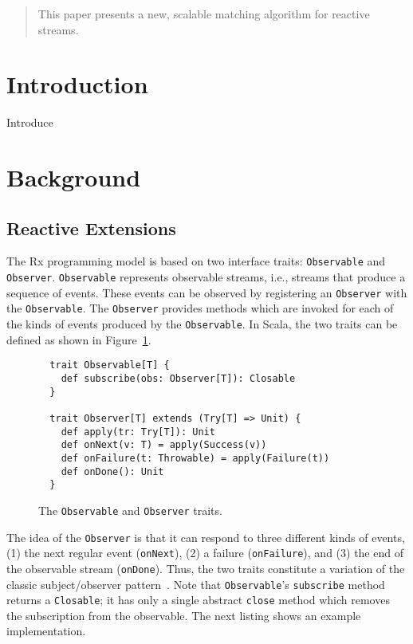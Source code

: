 \documentclass[runningheads]{llncs}
\begin{document}
\begin{sloppypar}
\begin{abstract}

This paper presents a new, scalable matching algorithm for
reactive streams.

\end{abstract}


\section{Introduction}
\label{sec:introduction}

Introduce

\section{Background}

\subsection{Reactive Extensions}

The Rx programming model is based on two interface traits: \verb|Observable|
and \verb|Observer|. \verb|Observable| represents observable streams, i.e.,
streams that produce a sequence of events. These events can be observed by
registering an \verb|Observer| with the \verb|Observable|. The \verb|Observer|
provides methods which are invoked for each of the kinds of events produced by
the \verb|Observable|. In Scala, the two traits can be defined as shown in
Figure~\ref{fig:observable-observer}.

\begin{figure}[ht!]
  \centering
  \lstset{numbers=none,xleftmargin=0em}
  \begin{lstlisting}
  trait Observable[T] {
    def subscribe(obs: Observer[T]): Closable
  }

  trait Observer[T] extends (Try[T] => Unit) {
    def apply(tr: Try[T]): Unit
    def onNext(v: T) = apply(Success(v))
    def onFailure(t: Throwable) = apply(Failure(t))
    def onDone(): Unit
  }
  \end{lstlisting}
  \caption{The \texttt{Observable} and \texttt{Observer} traits.}
  \label{fig:observable-observer}
\end{figure}

The idea of the \verb|Observer| is that it can respond to three different
kinds of events, (1) the next regular event (\verb|onNext|), (2) a failure
(\verb|onFailure|), and (3) the end of the observable stream (\verb|onDone|).
Thus, the two traits constitute a variation of the classic subject/observer
pattern~\cite{EugsterFGK03}. Note that \verb|Observable|'s \verb|subscribe|
method returns a \verb|Closable|; it has only a single abstract \verb|close|
method which removes the subscription from the observable. The next listing
shows an example implementation.


\end{sloppypar}
\end{document}
